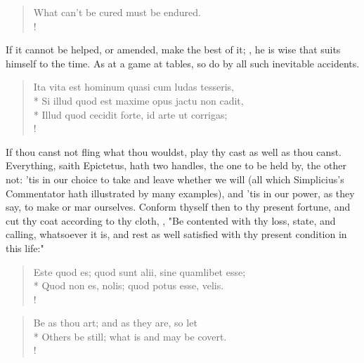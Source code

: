 {\begin{verse}%
What can't be cured must be endured.\\!
\end{verse}%

If it cannot be helped, or amended, make the best of it; , he is wise that suits himself to the time. As at a game at tables, so do by all such inevitable accidents.

\begin{latin}
\begin{verse}%
Ita vita est hominum quasi cum ludas tesseris,\\*
Si illud quod est maxime opus jactu non cadit,\\*
Illud quod cecidit forte, id arte ut corrigas;\\!
\end{verse}%
\end{latin}

If thou canst not fling what thou wouldst, play thy cast as well as thou canst. Everything, saith Epictetus, hath two handles, the one to be held by, the other not: 'tis in our choice to take and leave whether we will (all which Simplicius's Commentator hath illustrated by many examples), and 'tis in our power, as they say, to make or mar ourselves. Conform thyself then to thy present fortune, and cut thy coat according to thy cloth, , "Be contented with thy loss, state, and calling, whatsoever it is, and rest as well satisfied with thy present condition in this life:"

\begin{latin}
\begin{verse}%
Este quod es; quod sunt alii, sine quamlibet esse;\\*
Quod non es, nolis; quod potus esse, velis.\\!
\end{verse}%
\end{latin}



\begin{verse}%
Be as thou art; and as they are, so let\\*
Others be still; what is and may be covert.\\!
\end{verse}%

}
